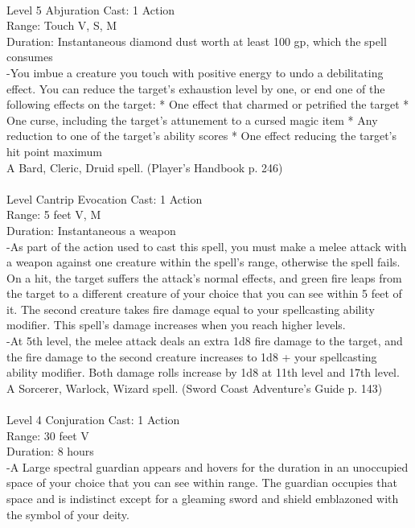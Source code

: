 \documentclass[10pt,twocolumn]{report}
\begin{document}
 \\
Level 5 \quad Abjuration \quad Cast: 1 Action\\
Range: Touch \quad V, S, M\\
Duration: Instantaneous \quad diamond dust worth at least 100 gp, which the spell consumes\\
-You imbue a creature you touch with positive energy to undo a debilitating effect. You can reduce the target’s exhaustion level by one, or end one of the following effects on the target: 
* One effect that charmed or petrified the target 
* One curse, including the target’s attunement to a cursed magic item 
* Any reduction to one of the target’s ability scores 
* One effect reducing the target’s hit point maximum\\
A Bard, Cleric, Druid spell. (Player's Handbook p. 246) \\


 \\
Level Cantrip \quad Evocation \quad Cast: 1 Action\\
Range: 5 feet \quad V, M\\
Duration: Instantaneous \quad a weapon\\
-As part of the action used to cast this spell, you must make a melee attack with a weapon against one creature within the spell's range, otherwise the spell fails. On a hit, the target suffers the attack's normal effects, and green fire leaps from the target to a different creature of your choice that you can see within 5 feet of it. The second creature takes fire damage equal to your spellcasting ability modifier. This spell's damage increases when you reach higher levels.\\
-At 5th level, the melee attack deals an extra 1d8 fire damage to the target, and the fire damage to the second creature increases to 1d8 + your spellcasting ability modifier. Both damage rolls increase by 1d8 at 11th level and 17th level.\\
A Sorcerer, Warlock, Wizard spell. (Sword Coast Adventure's Guide p. 143) \\


 \\
Level 4 \quad Conjuration \quad Cast: 1 Action\\
Range: 30 feet \quad V\\
Duration: 8 hours \quad \\
-A Large spectral guardian appears and hovers for the duration in an unoccupied space of your choice that you can see within range. The guardian occupies that space and is indistinct except for a gleaming sword and shield emblazoned with the symbol of your deity.
\end{document}
